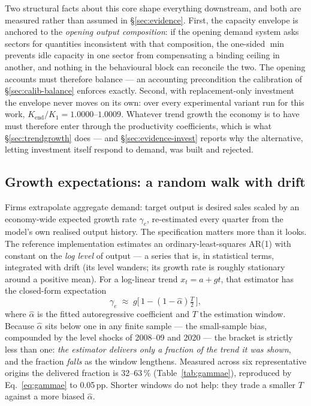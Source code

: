 \documentclass[11pt,a4paper]{article}
\newcommand{\pp}{\,pp}
\begin{document}
Two structural facts about this core shape everything downstream, and both are measured rather
than assumed in \S\ref{sec:evidence}. First, the capacity envelope is anchored to the
\emph{opening output composition}: if the opening demand system asks sectors for quantities
inconsistent with that composition, the one-sided $\min$ prevents idle capacity in one sector from
compensating a binding ceiling in another, and nothing in the behavioural block can reconcile the
two. The opening accounts must therefore balance --- an accounting precondition the calibration
of \S\ref{sec:calib-balance} enforces exactly. Second, with replacement-only investment the
envelope never moves on its own: over every experimental variant run for this work,
$K_{\text{end}}/K_1 = 1.0000$--$1.0009$. Whatever trend growth the economy is to have must
therefore enter through the productivity coefficients, which is what \S\ref{sec:trendgrowth}
does --- and \S\ref{sec:evidence-invest} reports why the alternative, letting investment itself
respond to demand, was built and rejected.

\subsection{Growth expectations: a random walk with drift}
\label{sec:expectations}

Firms extrapolate aggregate demand: target output is desired sales scaled by an economy-wide
expected growth rate $\gamma_e$, re-estimated every quarter from the model's own realised output
history. The specification matters more than it looks. The reference implementation estimates an
ordinary-least-squares AR(1) with constant on the \emph{log level} of output --- a series that is,
in statistical terms, integrated with drift (its level wanders; its growth rate is roughly
stationary around a positive mean). For a log-linear trend $x_t = a + g t$, that estimator has the
closed-form expectation
\begin{equation}
  \gamma_e \;\approx\; g\Big[\,1-(1-\hat\alpha)\tfrac{T}{2}\,\Big],
  \label{eq:gammae}
\end{equation}
where $\hat\alpha$ is the fitted autoregressive coefficient and $T$ the estimation window. Because
$\hat\alpha$ sits below one in any finite sample --- the \citet{kendall1954} small-sample bias,
compounded by the level shocks of 2008--09 and 2020 --- the bracket is strictly less than one:
\emph{the estimator delivers only a fraction of the trend it was shown}, and the fraction
\emph{falls} as the window lengthens. Measured across six representative origins the delivered
fraction is 32--63\,\% (Table~\ref{tab:gammae}), reproduced by Eq.~\eqref{eq:gammae} to
0.05\pp. Shorter windows do not help: they trade a smaller $T$ against a more biased $\hat\alpha$.
\end{document}
